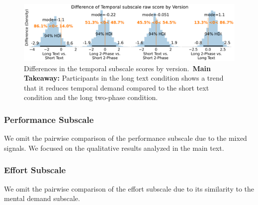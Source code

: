 \begin{figure}[h!]
    \centering
    \includegraphics[width=\textwidth]{content/image/cog/Temporal_cog_diff_single_row.pdf}
    \caption{Differences in the temporal subscale scores by version.~\textbf{Main Takeaway:} Participants in the long text condition shows a trend that it reduces temporal demand compared to the short text condition and the long two-phase condition.}
    \label{fig:bayesian_temporal_subscale}
\end{figure}

\subsubsection{Performance Subscale}
We omit the pairwise comparison of the performance subscale due to the mixed signals. We focused on the qualitative results analyzed in the main text.


\subsubsection{Effort Subscale}
We omit the pairwise comparison of the effort subscale due to its similarity to the mental demand subscale. 

